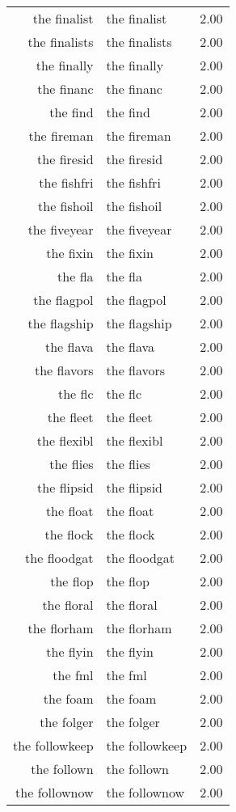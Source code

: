 \begin{table}[ht]
\begin{tabular}{rlr}
  the finalist & the finalist & 2.00 \\ 
  the finalists & the finalists & 2.00 \\ 
  the finally & the finally & 2.00 \\ 
  the financ & the financ & 2.00 \\ 
  the find & the find & 2.00 \\ 
  the fireman & the fireman & 2.00 \\ 
  the firesid & the firesid & 2.00 \\ 
  the fishfri & the fishfri & 2.00 \\ 
  the fishoil & the fishoil & 2.00 \\ 
  the fiveyear & the fiveyear & 2.00 \\ 
  the fixin & the fixin & 2.00 \\ 
  the fla & the fla & 2.00 \\ 
  the flagpol & the flagpol & 2.00 \\ 
  the flagship & the flagship & 2.00 \\ 
  the flava & the flava & 2.00 \\ 
  the flavors & the flavors & 2.00 \\ 
  the flc & the flc & 2.00 \\ 
  the fleet & the fleet & 2.00 \\ 
  the flexibl & the flexibl & 2.00 \\ 
  the flies & the flies & 2.00 \\ 
  the flipsid & the flipsid & 2.00 \\ 
  the float & the float & 2.00 \\ 
  the flock & the flock & 2.00 \\ 
  the floodgat & the floodgat & 2.00 \\ 
  the flop & the flop & 2.00 \\ 
  the floral & the floral & 2.00 \\ 
  the florham & the florham & 2.00 \\ 
  the flyin & the flyin & 2.00 \\ 
  the fml & the fml & 2.00 \\ 
  the foam & the foam & 2.00 \\ 
  the folger & the folger & 2.00 \\ 
  the followkeep & the followkeep & 2.00 \\ 
  the follown & the follown & 2.00 \\ 
  the follownow & the follownow & 2.00 \\ 

\end{tabular}
\end{table}
